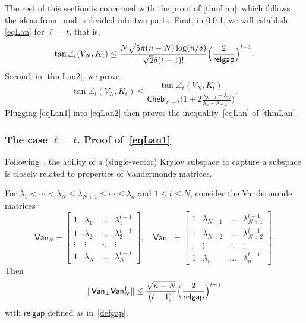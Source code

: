 \documentclass{siamart190516}
\newcommand{\van}{\mathsf{Van}}
\newcommand{\cheb}{\mathsf{Cheb}}
\newcommand{\gap}{\mathsf{relgap}}
\providecommand{\norm}[1]{\lVert#1\rVert}
\begin{document}
The rest of this section is concerned with the proof of \cref{thmLan}, which follows the ideas from~\cite{Meyer2023} and is divided into two parts. First, in \cref{thmLan1}, we will establish \cref{eqLan} for $\ell=t$, that is,
\begin{equation}
    \label{eqLan1}
    \tan\angle_{t}(V_{N},K_{t}) \leq \frac{N\sqrt{5\pi (n-N)\log(n/\delta)}}{\sqrt{2}\delta(t-1)!}\Bigl(\frac{2}{\gap}\Bigr)^{t-1}.
\end{equation}
Second, in \cref{thmLan2}, we prove 
\begin{equation}
    \label{eqLan2}
    \tan\angle_{t}(V_{N},K_{\ell})\leq \frac{\tan\angle_{t}(V_{N},K_{t})}{\cheb_{\ell-t}\big(1+2\frac{\lambda_{N+1}-\lambda_{N}}{\lambda_{n}-\lambda_{N+1}}\big)}.
\end{equation}
Plugging \cref{eqLan1} into \cref{eqLan2} then proves the inequality~\cref{eqLan} of \cref{thmLan}.



\subsubsection{The case $\ell = t$. Proof of~\cref{eqLan1}}


\label{thmLan1}
Following~\cite[Theorem~3]{Meyer2023}, the ability of a (single-vector) Krylov subspace to capture a subspace is closely related to properties of Vandermonde matrices.
\begin{lemma}
    \label{lemVan}
    For $\lambda_1 < \dotsb < \lambda_N \le \lambda_{N+1} \le \dotsb \le \lambda_n$ and     $1\leq t\leq N$, consider the 
    Vandermonde matrices 
    \begin{equation}
        \label{defVan}
        \van_{N} = \begin{bmatrix}
            1 & \lambda_{1} & \ldots & \lambda_{1}^{t-1}\\ 
            1 & \lambda_{2} & \ldots & \lambda_{2}^{t-1}\\ 
            \vdots & \vdots & \ddots & \vdots\\
            1 & \lambda_{N} & \ldots & \lambda_{N}^{t-1} 
        \end{bmatrix}, \quad 
        \van_{\perp} = \begin{bmatrix}
            1 & \lambda_{N+1} & \ldots & \lambda_{N+1}^{t-1}\\ 
            1 & \lambda_{N+2} & \ldots & \lambda_{N+2}^{t-1}\\ 
            \vdots & \vdots & \ddots & \vdots\\
            1 & \lambda_{n} & \ldots & \lambda_{n}^{t-1} 
        \end{bmatrix}.
    \end{equation} 
    Then 
    \begin{equation*}
        \norm{\van_{\perp}\van_{N}^{\dagger}}\leq \frac{\sqrt{n-N}}{(t-1)!}\Bigl(\frac{2}{\gap}\Bigr)^{t-1}
    \end{equation*}
    with $\gap$ defined as in~\cref{defgap}.
\end{lemma}
\end{document}

